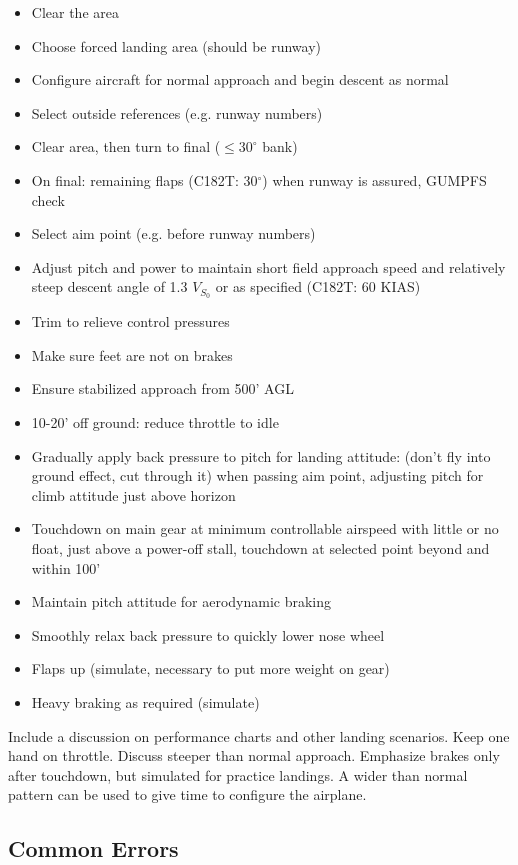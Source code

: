 \begin{itemize}
  \item Clear the area
  \item Choose forced landing area (should be runway)
  \item Configure aircraft for normal approach and begin descent as normal
  \item Select outside references (e.g. runway numbers)
  \item Clear area, then turn to final ($\leq 30^\circ$ bank)
  \item On final: remaining flaps (C182T: 30$^\circ$) when runway is assured,
    GUMPFS check
  \item Select aim point (e.g. before runway numbers)
  \item Adjust pitch and power to maintain short field approach speed and
    relatively steep descent angle of 1.3 $V_{S_0}$ or as specified (C182T: 60
    KIAS)
  \item Trim to relieve control pressures
  \item Make sure feet are not on brakes
  \item Ensure stabilized approach from 500' AGL
  \item 10-20' off ground: reduce throttle to idle
  \item Gradually apply back pressure to pitch for landing attitude: (don't fly
    into ground effect, cut through it) when passing aim point, adjusting
    pitch for climb attitude just above horizon
  \item Touchdown on main gear at minimum controllable airspeed with little or
    no float, just above a power-off stall, touchdown at selected point beyond
    and within 100'
  \item Maintain pitch attitude for aerodynamic braking
  \item Smoothly relax back pressure to quickly lower nose wheel
  \item Flaps up (simulate, necessary to put more weight on gear)
  \item Heavy braking as required (simulate)
\end{itemize}

Include a discussion on performance charts and other landing scenarios. Keep
one hand on throttle. Discuss steeper than normal approach. Emphasize brakes
only after touchdown, but simulated for practice landings. A wider than normal
pattern can be used to give time to configure the airplane.

\subsection{Common Errors}

